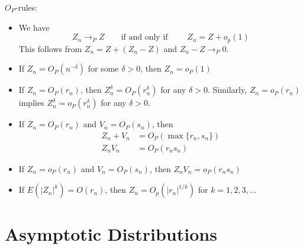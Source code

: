 \documentclass[
]{book}
\providecommand{\tightlist}{%
  \setlength{\itemsep}{0pt}\setlength{\parskip}{0pt}}
\begin{document}
\hfill\break

\(O_P\)-rules:

\begin{itemize}
\tightlist
\item
  We have
  \[Z_n\rightarrow_P Z \qquad \text{if and only if }\qquad Z_n=Z+o_p(1)\]
  This follows from \(Z_n=Z+(Z_n-Z)\) and \(Z_n-Z\rightarrow_P 0\).
\end{itemize}

\hfill\break

\begin{itemize}
\tightlist
\item
  If \(Z_n=O_P(n^{-\delta})\) for some \(\delta>0\), then \(Z_n=o_P(1)\)
\end{itemize}

\hfill\break

\begin{itemize}
\tightlist
\item
  If \(Z_n=O_P(r_n)\), then \(Z_n^\delta=O_P(r_n^\delta)\) for any \(\delta>0\). Similarly,
  \(Z_n=o_P(r_n)\) implies \(Z_n^\delta=o_P(r_n^\delta)\) for any \(\delta>0\).
\end{itemize}

\hfill\break

\begin{itemize}
\tightlist
\item
  If \(Z_n=O_P(r_n)\) and \(V_n=O_P(s_n)\), then
  \begin{align*}
  Z_n+V_n & =O_P(\max\{r_n,s_n\})\\
  Z_nV_n &  =O_P(r_ns_n)
  \end{align*}
\end{itemize}

\hfill\break

\begin{itemize}
\tightlist
\item
  If \(Z_n=o_P(r_n)\) and \(V_n=O_P(s_n)\), then \(Z_nV_n=o_P(r_n s_n)\)
\end{itemize}

\hfill\break

\begin{itemize}
\tightlist
\item
  If \(E(|Z_n|^k)=O(r_n)\), then \(Z_n=O_p(|r_n|^{1/k})\) for \(k=1,2,3,\dots\)
\end{itemize}

\hypertarget{asymptotic-distributions}{%
\section{Asymptotic Distributions}\label{asymptotic-distributions}}
\end{document}
